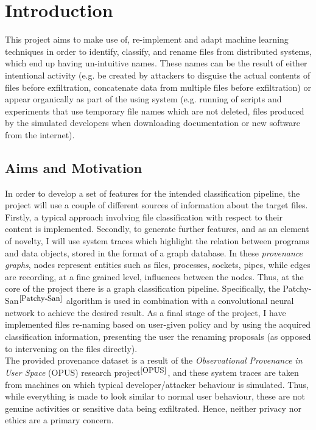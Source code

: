

\chapter{Introduction}

This project aims to make use of, re-implement and adapt machine learning techniques in order to identify, classify, and rename files from distributed systems, which end up having un-intuitive names. These names can be the result of either intentional activity (e.g. be created by attackers to disguise the actual contents of files before exfiltration, concatenate data from multiple files before exfiltration) or appear organically as part of the using system (e.g. running of scripts and experiments that use temporary file names which are not deleted, files produced by the simulated developers when downloading documentation or new software from the internet). \\


\section{Aims and Motivation}  \label{1.1}

In order to develop a set of features for the intended classification pipeline, the project will use a couple of different sources of information about the target files. Firstly, a typical approach involving file classification with respect to their content is implemented. Secondly, to generate further features, and as an element of novelty, I will use system traces which highlight the relation between programs and data objects, stored in the format of a graph database. In these \textit{provenance graphs}, nodes represent entities such as files, processes, sockets, pipes, while edges are recording, at a fine grained level, influences between the nodes. Thus, at the core of the project there is a graph classification pipeline. Specifically, the Patchy-San$^{\small \cite{Patchy-San}}$ algorithm is used in combination with a convolutional neural network to achieve the desired result. As a final stage of the project, I have implemented files re-naming based on user-given policy and by using the acquired classification information, presenting the user the renaming proposals (as opposed to intervening on the files directly). \\

The provided provenance dataset is a result of the \textit{Observational Provenance in User Space} (OPUS) research project$^{\small \cite{OPUS}}$, and these system traces are taken from machines on which typical developer/attacker behaviour is simulated. Thus, while everything is made to look similar to normal user behaviour, these are not genuine activities or sensitive data being exfiltrated. Hence, neither privacy nor ethics are a primary concern. \\

